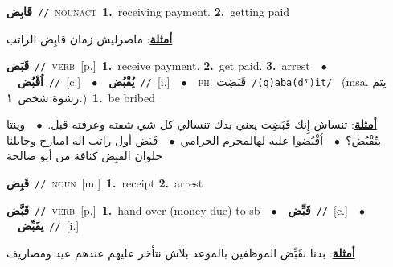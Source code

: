 \documentclass[10pt,a4paper,twoside]{article} %
\begin{document}
\begin{multicols}{2}
{\setlength\topsep{0pt}\textbf{\foreignlanguage{arabic}{قَابِض}}\ {\color{gray}\texttt{//}\color{black}}\ \textsc{noun\textunderscore act}\ \textbf{1.}~receiving payment.  \textbf{2.}~getting paid\  \begin{flushright}\color{gray}\foreignlanguage{arabic}{\textbf{\underline{\foreignlanguage{arabic}{أمثلة}}}: ماصرليش زمان قابِض الراتب}\end{flushright}\color{black}} \vspace{2mm}

{\setlength\topsep{0pt}\textbf{\foreignlanguage{arabic}{قَبَض}}\ {\color{gray}\texttt{//}\color{black}}\ \textsc{verb}\ [p.]\ \textbf{1.}~receive payment.  \textbf{2.}~get paid.  \textbf{3.}~arrest\ \ $\bullet$\ \ \setlength\topsep{0pt}\textbf{\foreignlanguage{arabic}{اُقْبُض}}\ {\color{gray}\texttt{//}\color{black}}\ [c.]\ \ $\bullet$\ \ \setlength\topsep{0pt}\textbf{\foreignlanguage{arabic}{يُقْبُض}}\ {\color{gray}\texttt{//}\color{black}}\ [i.]\ \ $\bullet$\ \ \textsc{ph.} \color{gray} \foreignlanguage{arabic}{قَبَضِت}\color{black}\ {\color{gray}\texttt{/{\sffamily (q)aba(dˤ)it}/}\color{black}}\ \color{gray} (msa. \foreignlanguage{arabic}{يتم رشوة شخص}~\foreignlanguage{arabic}{\textbf{١.}})\color{black}\ \textbf{1.}~be bribed\  \begin{flushright}\color{gray}\foreignlanguage{arabic}{\textbf{\underline{\foreignlanguage{arabic}{أمثلة}}}: تنساش إِنك قَبَضِت يعني بدك تنسالي كل شي شفته وعرفته قبل.\ $\bullet$\ \  وينتا بتُقْبُض؟\ $\bullet$\ \  اُقْبُضوا عليه لهالمجرم الحرامي\ $\bullet$\ \  قَبَض أول راتب اله امبارح وجابلنا حلوان القبِض كنافة من أبو صالحة}\end{flushright}\color{black}} \vspace{2mm}

{\setlength\topsep{0pt}\textbf{\foreignlanguage{arabic}{قَبِض}}\ {\color{gray}\texttt{//}\color{black}}\ \textsc{noun}\ [m.]\ \textbf{1.}~receipt  \textbf{2.}~arrest\ } \vspace{2mm}

{\setlength\topsep{0pt}\textbf{\foreignlanguage{arabic}{قَبَّض}}\ {\color{gray}\texttt{//}\color{black}}\ \textsc{verb}\ [p.]\ \textbf{1.}~hand over (money due) to sb\ \ $\bullet$\ \ \setlength\topsep{0pt}\textbf{\foreignlanguage{arabic}{قَبِّض}}\ {\color{gray}\texttt{//}\color{black}}\ [c.]\ \ $\bullet$\ \ \setlength\topsep{0pt}\textbf{\foreignlanguage{arabic}{يقَبِّض}}\ {\color{gray}\texttt{//}\color{black}}\ [i.]\  \begin{flushright}\color{gray}\foreignlanguage{arabic}{\textbf{\underline{\foreignlanguage{arabic}{أمثلة}}}: بدنا نقَبِّض الموظفين بالموعد بلاش نتأخر عليهم عندهم عيد ومصاريف}\end{flushright}\color{black}} \vspace{2mm}


\end{multicols}
\end{document}
